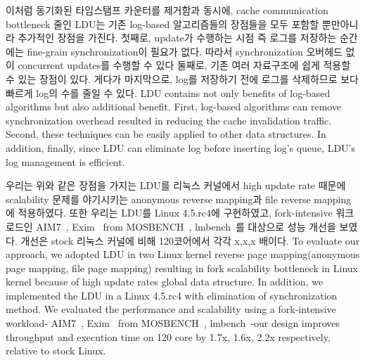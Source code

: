 \ifkor
이처럼 동기화된 타임스탬프 카운터를 제거함과 동시에, cache communication bottleneck 줄인
LDU는 기존 log-based 알고리즘들의 장점들을 모두 포함할 뿐만아니라 추가적인 장점을 가진다.
첫째로, update가 수행하는 시점 즉 로그를 저장하는 순간에는 fine-grain synchronization이 필요가 없다. 
따라서 synchronization 오버헤드 없이 concurrent updates를 수행할 수 있다
둘째로, 기존 여러 자료구조에 쉽게 적용할 수 있는 장점이 있다.
게다가 마지막으로, log를 저장하기 전에 로그를 삭제하므로 보다 빠르게 log의 수를 줄일 수 있다. 
\else
LDU contains not only benefits of log-based algorithms but also additional benefit.
First, log-based algorithms can remove synchronization overhead resulted in
reducing the cache invalidation traffic.
Second, these techniques can be easily applied to other data structures.
In addition, finally, since LDU can eliminate log before inserting log's queue,
LDU's log management is efficient.
\fi


\ifkor
우리는 위와 같은 장점을 가지는 LDU를 리눅스 커널에서 high update rate 때문에 scalability 문제를 야기시키는
anonymous reverse mapping과 file reverse mapping에 적용하였다.
또한 우리는 LDU를 Linux 4.5.rc4에 구현하였고, fork-intensive 워크로드인
AIM7~\cite{AIM7Benchmark}, Exim~\cite{Exim} from MOSBENCH~\cite{MOSBENCH},
lmbench~\cite{mcvoy1996lmbench}를 대상으로 성능 개선을 보였다. 개선은 stock 리눅스 커널에 비해 120코어에서
각각 x,x,x 배이다.
\else
To evaluate our approach, we adopted LDU in two Linux kernel reverse page
mapping(anonymous page mapping, file page mapping) resulting in fork
scalability bottleneck in Linux kernel because of high update rates global data
structure.
In addition, we implemented the LDU in a Linux 4.5.rc4 with elimination of
synchronization method.
We evaluated the performance and scalability using a fork-intensive workload-
AIM7~\cite{AIM7Benchmark}, Exim~\cite{Exim} from MOSBENCH~\cite{MOSBENCH},
lmbench~\cite{mcvoy1996lmbench}-our design improves throughput and execution
time on 120 core by 1.7x, 1.6x, 2.2x respectively, relative to stock Linux.
\fi


